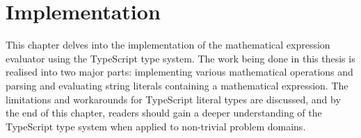 \chapter{Implementation}

This chapter delves into the implementation of the mathematical expression evaluator using the TypeScript type system. The work being done in this thesis is realised into two major parts: implementing various mathematical operations and parsing and evaluating string literals containing a mathematical expression. The limitations and workarounds for TypeScript literal types are discussed, and by the end of this chapter, readers should gain a deeper understanding of the TypeScript type system when applied to non-trivial problem domains.





\clearpage







\clearpage





